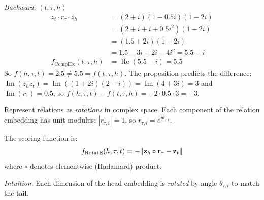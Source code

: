 \begin{notechapter}
\begin{example}
\emph{Backward}: $(t, \tau, h)$
\begin{align*}
z_t \cdot r_\tau \cdot \bar{z}_h &= (2 + i)(1 + 0.5i)(1 - 2i) \\
&= (2 + i + i + 0.5i^2)(1 - 2i) \\
&= (1.5 + 2i)(1 - 2i) \\
&= 1.5 - 3i + 2i - 4i^2 = 5.5 - i \\
f_{\text{ComplEx}}(t, \tau, h) &= \operatorname{Re}(5.5 - i) = 5.5
\end{align*}
So $f(h, \tau, t) = 2.5 \neq 5.5 = f(t, \tau, h)$. The proposition predicts the difference: $\operatorname{Im}(z_h\bar z_t) = \operatorname{Im}((1+2i)(2-i)) = \operatorname{Im}(4 + 3i) = 3$ and $\operatorname{Im}(r_\tau) = 0.5$, so $f(h,\tau,t) - f(t,\tau,h) = -2\cdot0.5\cdot3 = -3$.
\end{example}

\begin{definition}
Represent relations as \emph{rotations} in complex space. Each component of the relation embedding has unit modulus: $|r_{\tau,i}| = 1$, so $r_{\tau,i} = e^{i\theta_{\tau,i}}$.

The scoring function is:
\begin{equation}
f_{\text{RotatE}}(h, \tau, t) = -\|\mathbf{z}_h \circ \mathbf{r}_\tau - \mathbf{z}_t\|
\end{equation}
where $\circ$ denotes elementwise (Hadamard) product.

\emph{Intuition}: Each dimension of the head embedding is \emph{rotated} by angle $\theta_{\tau,i}$ to match the tail.
\end{definition}

\begin{figure}[htbp]
\centering
{}
\end{figure}
\end{notechapter}
